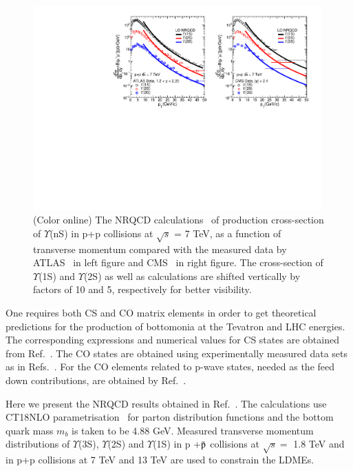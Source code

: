 \begin{figure}
  \centering
  \includegraphics[width=0.99\textwidth]{Figures/Fig4_CMS_ATLAS_YnS_7TeV_Pt.pdf}
  \caption{\small{(Color online) The NRQCD calculations~\cite{Kumar:2021sek} of production cross-section of $\Upsilon$(nS) in
      p+p collisions at $\sqrt{s}$ = 7 TeV, as a function of transverse momentum compared with
      the measured data by ATLAS~\cite{ATLAS:2012lmu} in left figure and CMS~\cite{CMS:2013qur}
      in right figure. The cross-section of $\Upsilon$(1S) and $\Upsilon$(2S) as well as
      calculations are shifted vertically by factors of 10 and 5, respectively for better visibility.}}
  \label{Fig:SigmaYnSCMS7TeV}
\end{figure}







One requires both CS and CO matrix elements in order to get theoretical
predictions for the production of bottomonia at the Tevatron and LHC energies.
The corresponding expressions and
numerical values for CS states are obtained from Ref.~\cite{Braaten:2000cm}.
The CO states are obtained using experimentally measured data sets 
as in Refs.~\cite{Braaten:2000cm,Cho:1995vh,Cho:1995ce}. 
For the CO elements related to p-wave states, needed as the 
feed down contributions, are obtained by Ref.~\cite{Sharma:2012dy,Feng:2015wka}.

Here we present the NRQCD results obtained in Ref.~\cite{Kumar:2021sek}.
The calculations use CT18NLO parametrisation~\cite{Hou:2019efy} for parton distribution
functions and the bottom quark mass $m_b$ is taken to be 4.88 GeV.
Measured transverse momentum distributions of $\Upsilon$(3S), 
$\Upsilon$(2S) and $\Upsilon$(1S) in p +{$\bar {\rm p}$} collisions at
$\sqrt{s}=$ 1.8 TeV and in p+p collisions at 7 TeV and 13 TeV are used to constrain
the LDMEs.

